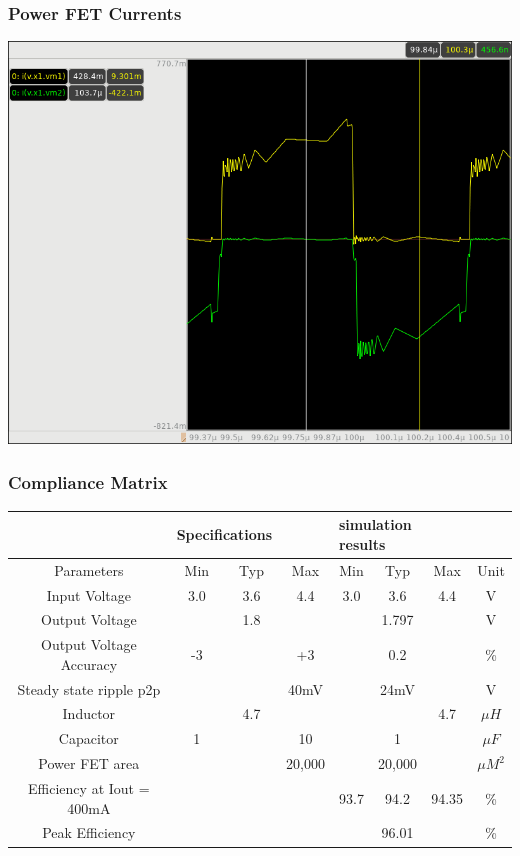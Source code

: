 \documentclass{beamer}
\begin{document}
\begin{frame}
  \frametitle{Power FET Currents}
  \includegraphics[scale=0.25]{hiside-lowside-current.png}
\end{frame}

\begin{frame}
  \frametitle{Compliance Matrix}
  \begin{center}
    {\scriptsize
      \begin{tabular}{| c | c | c | c | c  | c | c | c |}
        \hline      
         & \multicolumn{2}{l}{Specifications} & & \multicolumn{3}{l}{simulation results} &\\
        \hline
        Parameters & Min & Typ & Max & Min & Typ & Max & Unit \\
        \hline
        Input Voltage & 3.0 & 3.6 & 4.4 & 3.0 & 3.6 & 4.4 & V \\
        Output Voltage & & 1.8 &  & & 1.797 & & V \\
        Output Voltage Accuracy & -3 & & +3 & & 0.2 & & \% \\
        Steady state ripple p2p &  & & 40mV & & 24mV & & V \\
        Inductor & & 4.7 & & & & 4.7 & $\mu H$ \\
        Capacitor & 1 &  & 10 & & 1 & & $\mu F$ \\
        Power FET area & & & 20,000 & & 20,000 & & $\mu M^2$ \\
        Efficiency at Iout = 400mA & & & & 93.7 & 94.2 & 94.35 & \% \\
        Peak Efficiency & & & &  & 96.01 & & \% \\      
        \hline
      \end{tabular}
    }
  \end{center}

\end{frame}
\end{document}
